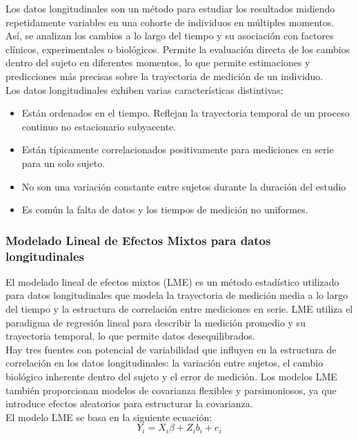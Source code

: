 	Los datos longitudinales son un método para estudiar los resultados midiendo repetidamente variables en una cohorte de individuos en múltiples momentos. Así, se analizan los cambios a lo largo del tiempo y su asociación con factores clínicos, experimentales o biológicos. Permite la evaluación directa de los cambios dentro del sujeto en diferentes momentos, lo que permite estimaciones y predicciones más precisas sobre la trayectoria de medición de un individuo.\\ Los datos longitudinales exhiben varias características distintivas:
	\begin{itemize}
		\item Están ordenados en el tiempo. Reflejan la trayectoria temporal de un proceso continuo no estacionario subyacente.
		\item Están típicamente correlacionados positivamente para mediciones en serie para un solo sujeto.
		\item No son una variación constante entre sujetos durante la duración del estudio
		\item Es común la falta de datos y los tiempos de medición no uniformes.
	\end{itemize}
	
	\subsubsection{Modelado Lineal de Efectos Mixtos para datos longitudinales}
	
	El modelado lineal de efectos mixtos (LME) es un método estadístico utilizado para datos longitudinales que modela la trayectoria de medición media a lo largo del tiempo y la estructura de correlación entre mediciones en serie. LME utiliza el paradigma de regresión lineal \cite{montgomery2021introduction} para describir la medición promedio y su trayectoria temporal, lo que permite datos desequilibrados.\\
	
	Hay tres fuentes con potencial de variabilidad que influyen en la estructura de correlación en los datos longitudinales: la variación entre sujetos, el cambio biológico inherente dentro del sujeto y el error de medición. Los modelos LME también proporcionan modelos de covarianza flexibles y parsimoniosos, ya que introduce efectos aleatorios para estructurar la covarianza.\\
	
	El modelo LME se basa en la siguiente ecuación:
	\begin{equation}
		Y_{i} = X_{i}\beta + Z_{i}b_{i} + e_{i}
	\end{equation}
	

